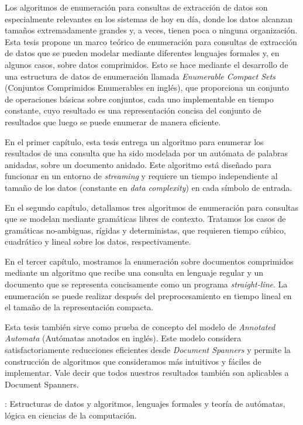 \noindent Los algoritmos de enumeración para consultas de extracción de datos son especialmente relevantes en los sistemas de hoy en día, donde los datos alcanzan tamaños extremadamente grandes y, a veces, tienen poca o ninguna organización.
Esta tesis propone un marco teórico de enumeración para consultas de extracción de datos que se pueden modelar mediante diferentes lenguajes formales y, en algunos casos, sobre datos comprimidos. Esto se hace mediante el desarrollo de una estructura de datos de enumeración llamada {\em Enumerable Compact Sets} (Conjuntos Comprimidos Enumerables en inglés), que proporciona un conjunto de operaciones básicas sobre conjuntos, cada uno implementable en tiempo constante, cuyo resultado es una representación concisa del conjunto de resultados que luego se puede enumerar de manera eficiente.

\noindent En el primer capítulo, esta tesis entrega un algoritmo para enumerar los resultados de una consulta que ha sido modelada por un autómata de palabras anidadas, sobre un documento anidado. Este algoritmo está diseñado para funcionar en un entorno de {\em streaming} y requiere un tiempo independiente al tamaño de los datos (constante en {\em data complexity}) en cada símbolo de entrada.

\noindent En el segundo capítulo, detallamos tres algoritmos de enumeración para consultas que se modelan mediante gramáticas libres de contexto. Tratamos los casos de gramáticas no-ambiguas, rígidas y deterministas, que requieren tiempo cúbico, cuadrático y lineal sobre los datos, respectivamente.

\noindent En el tercer capítulo, mostramos la enumeración sobre documentos comprimidos mediante un algoritmo que recibe una consulta en lenguaje regular y un documento que se representa concisamente como un programa {\em straight-line}. La enumeración se puede realizar después del preprocesamiento en tiempo lineal en el tamaño de la representación compacta.

\noindent Esta tesis también sirve como prueba de concepto del modelo de {\em Annotated Automata} (Autómatas anotados en inglés). Este modelo considera satisfactoriamente reducciones eficientes desde {\em Document Spanners} y permite la construcción de algoritmos que consideramos más intuitivos y fáciles de implementar. Vale decir que todos nuestros resultados también son aplicables a Document Spanners.

: Estructuras de datos y algoritmos, lenguajes formales y teoría de autómatas, lógica en ciencias de la computación.